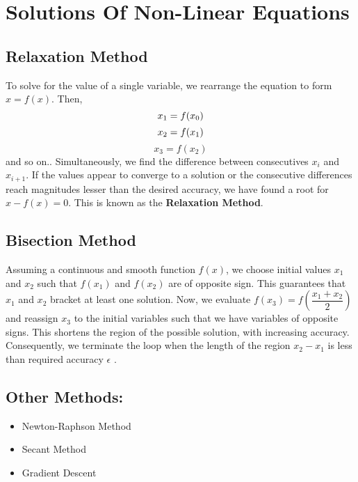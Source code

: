 \section{Solutions Of Non-Linear Equations}
\subsection{Relaxation Method}
To solve for the value of a single variable, we rearrange the equation to form $x = f(x)$. Then, $$x_{1}=f(x_{0})\\$$
$$x_{2}=f(x_{1}) \\$$
$$x_{3}=f(x_{2})$$
and so on.. Simultaneously, we find the difference between consecutives $x_{i}$ and $x_{i+1}$. If the values appear to converge to a solution or the consecutive differences reach magnitudes lesser than the desired accuracy, we have found a root for $x-f(x)=0$. This is known as the \textbf{Relaxation Method}. 
\subsection{Bisection Method}
Assuming a continuous and smooth function $f(x)$, we choose initial values $x_{1}$ and $x_{2}$ such that $f(x_{1})$ and $f(x_{2})$ are of opposite sign. This guarantees that $x_{1}$ and $x_{2}$ bracket at least one solution. Now, we evaluate $f(x_{3})=f\left(\dfrac{x_{1}+x_{2}}{2}\right)$ and reassign $x_{3}$ to the initial variables such that we have variables of opposite signs. This shortens the region of the possible solution, with increasing accuracy. Consequently, we terminate the loop when the length of the region $x_{2}-x_{1}$ is less than required accuracy $\epsilon$ .
\subsection{Other Methods:}
\begin{itemize}
	\item Newton-Raphson Method
	\item Secant Method
	\item Gradient Descent
\end{itemize}
